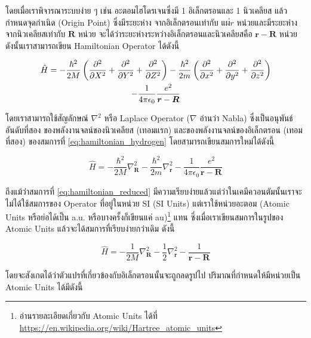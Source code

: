 โดยเมื่อเราพิจารณาระบบง่าย ๆ เช่น อะตอมไฮโดรเจนซึ่งมี 1 อิเล็กตรอนและ 1 นิวเคลียส แล้วกำหนดจุดกำเนิด (Origin Point) ซึ่งมีระยะห่าง%
จากอิเล็กตรอนเท่ากับ $แผ่{r}$ หน่วยและมีระยะห่างจากนิวเคลียสเท่ากับ $\bm{R}$ หน่วย จะได้ว่าระยะห่างระหว่างอิเล็กตรอนและนิวเคลียสคือ 
$\bm{r}-\bm{R}$ หน่วย ดังนั้นเราสามารถเขียน Hamiltonian Operator ได้ดังนี้

\begin{multline}\label{eq:hamiltonian_hydrogen}
    \hat{H} = -\frac{\hbar^{2}}{2M} \left( \pdv[2]{X} + \pdv[2]{Y} + \pdv[2]{Z} \right) 
              -\frac{\hbar^{2}}{2m} \left( \pdv[2]{x} + \pdv[2]{y} + \pdv[2]{z} \right) 
              \\
             -\frac{1}{4\pi\epsilon_{0}}\frac{e^{2}}{\bm{r}-\bm{R}}
\end{multline}

\noindent โดยเราสามารถใช้สัญลักษณ์ $\nabla^{2}$ หรือ Laplace Operator ($\nabla$ อ่านว่า Nabla) ซึ่งเป็นอนุพันธ์อันดับที่สอง%
ของพลังงานจลน์ของนิวเคลียส (เทอมแรก) และของพลังงานจลน์ของอิเล็กตรอน (เทอมที่สอง) ของสมการที่ \ref{eq:hamiltonian_hydrogen} 
โดยสามารถเขียนสมการใหม่ได้ดังนี้

\begin{equation}\label{eq:hamiltonian_reduced}
    \hat{H} = -\frac{\hbar^{2}}{2M} \nabla^{2}_{\bm{R}} - \frac{\hbar^{2}}{2m} \nabla^{2}_{\bm{r}}
              -\frac{1}{4\pi\epsilon_{0}}\frac{e^{2}}{\bm{r}-\bm{R}}
\end{equation}

ถึงแม้ว่าสมการที่ \ref{eq:hamiltonian_reduced} มีความเรียบง่ายแล้วแต่ว่าในเคมีควอนตัมนั้นเราจะไม่ได้ใช้สมการของ Operator ที่อยู่ในหน่วย
SI (SI Units) แต่เราใช้หน่วยอะตอม (Atomic Units หรือย่อได้เป็น a.u. หรือบางครั้งก็เขียนแค่ au)\footnote{อ่านรายละเอียดเกี่ยวกับ
Atomic Units ได้ที่ \url{https://en.wikipedia.org/wiki/Hartree_atomic_units}} แทน ซึ่งเมื่อเราเขียนสมการในรูปของ 
Atomic Units แล้วจะได้สมการที่เรียบง่ายกว่าเดิม ดังนี้

\begin{equation}\label{eq:hamiltonian_au}
    \hat{H} = -\frac{1}{2M} \nabla^{2}_{\bm{R}} - \frac{1}{2} \nabla^{2}_{\bm{r}}
              -\frac{1}{\bm{r}-\bm{R}}
\end{equation}

\noindent โดยจะสังเกตได้ว่าตัวแปรที่เกี่ยวข้องกับอิเล็กตรอนนั้นจะถูกลดรูปไป ปริมาณที่กำหนดให้มีหน่วยเป็น Atomic Units ได้มีดังนี้

